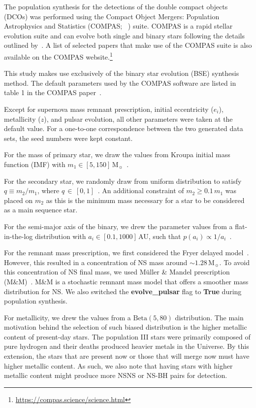 The population synthesis for the detections of the double compact objects (DCOs) was performed using the Compact
Object Mergers: Population Astrophysics and Statistics (COMPAS; ~\cite{stevenson2017formation, Riley2022,
    Vigna2018}) suite.
COMPAS is a rapid stellar evolution suite and can evolve both single and binary stars following the details outlined
by~\cite{Hurley2000, Hurley2002}.
A list of selected papers that make use of the COMPAS suite is also available on the COMPAS website.\footnote{\url{https://compas.science/science.html}}

This study makes use exclusively of the binary star evolution (BSE) synthesis method.
The default parameters used by the COMPAS software are listed in table 1 in the COMPAS paper~\cite{Riley2022}.

Except for supernova mass remnant prescription, initial eccentricity ($e_i$), metallicity ($z$), and pulsar evolution, all other parameters were taken at the default value.
For a one-to-one correspondence between the two generated data sets, the seed numbers were kept constant.

For the mass of primary star, we draw the values from Kroupa initial mass function (IMF) with $m_1 \in [5, 150]\,\text{M}_\sun$~\cite{kroupa2001variation}.

For the secondary star, we randomly draw from uniform distribution to satisfy $q\equiv m_2/m_1$, where $q\,\in\,[0, 1]$~\cite{sana2012binary}.
An additional constraint of $m_2 \geq 0.1\,m_1$ was placed on $m_2$ as this is the minimum mass necessary for a star to be considered as a main sequence star.

For the semi-major axis of the binary, we drew the parameter values from a flat-in-the-log distribution with $a_i \in [0.1, 1000]\,$AU, such that
$p(a_i) \propto 1/a_i$~\cite{opik1924photographic}.

For the remnant mass prescription, we first considered the Fryer delayed model~\cite{Fryer2012}.
However, this resulted in a concentration of NS mass around $\sim1.28\,\text{M}_\sun$.
To avoid this concentration of NS final mass, we used Müller \& Mandel prescription (M\&M)~\cite{Mandel2020}.
M\&M is a stochastic remnant mass model that offers a smoother mass distribution for NS\@.
We also switched the \textbf{evolve\_pulsar} flag to \textbf{True} during population synthesis.

For metallicity, we drew the values from a $\text{Beta}(5, 80)$ distribution.
The main motivation behind the selection of such biased distribution is the higher metallic content of present-day stars.
The population III stars were primarily composed of pure hydrogen and their deaths produced heavier metals in the Universe.
By this extension, the stars that are present now or those that will merge now must have higher metallic content.
As such, we also note that having stars with higher metallic content might produce more NSNS or NS-BH pairs for detection.

